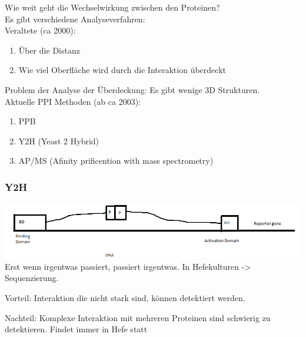 \documentclass{article}
\begin{document}
Wie weit geht die Wechselwirkung zwischen den Proteinen?\\

Es gibt verschiedene Analyseverfahren:\\


Veraltete (ca 2000):
\begin{enumerate}
  \item Über die Distanz
  \item Wie viel Oberfläche wird durch die Interaktion überdeckt
\end{enumerate}

Problem der Analyse der Überdeckung: Es gibt wenige 3D Strukturen. \\


Aktuelle PPI Methoden (ab ca 2003): 
\begin{enumerate}
  \item PPB
  \item Y2H (Yeast 2 Hybrid)
  \item AP/MS (Afinity prificention with mass spectrometry)
\end{enumerate}

\subsubsection{Y2H}
\includegraphics[scale=0.5]{Y2H}\\

Erst wenn irgentwas passiert, passiert irgentwas. In Hefekulturen -> Sequenzierung.

Vorteil:
Interaktion die nicht stark sind, können detektiert werden. 

Nachteil:
Komplexe Interaktion mit mehreren Proteinen sind schwierig zu detektieren.
Findet immer in Hefe statt
\end{document}
